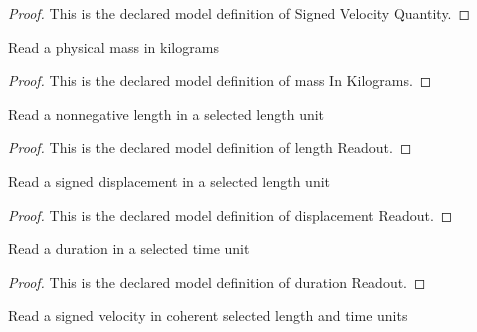 \begin{proof}
  This is the declared model definition of Signed Velocity Quantity.
\end{proof}
\begin{definition}
  \label{def:physics:phyx-mini-0717:phyxminiproblems-problemphyxmini0717-massinkilograms}
  Read a physical mass in kilograms
\end{definition}
\begin{proof}
  This is the declared model definition of mass In Kilograms.
\end{proof}
\begin{definition}
  \label{def:physics:phyx-mini-0717:phyxminiproblems-problemphyxmini0717-lengthreadout}
  Read a nonnegative length in a selected length unit
\end{definition}
\begin{proof}
  This is the declared model definition of length Readout.
\end{proof}
\begin{definition}
  \label{def:physics:phyx-mini-0717:phyxminiproblems-problemphyxmini0717-displacementreadout}
  Read a signed displacement in a selected length unit
\end{definition}
\begin{proof}
  This is the declared model definition of displacement Readout.
\end{proof}
\begin{definition}
  \label{def:physics:phyx-mini-0717:phyxminiproblems-problemphyxmini0717-durationreadout}
  Read a duration in a selected time unit
\end{definition}
\begin{proof}
  This is the declared model definition of duration Readout.
\end{proof}
\begin{definition}
  \label{def:physics:phyx-mini-0717:phyxminiproblems-problemphyxmini0717-velocityreadout}
  Read a signed velocity in coherent selected length and time units
\end{definition}

